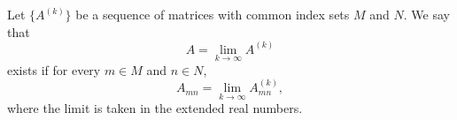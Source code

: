 Let $\{A^{(k)}\}$ be a sequence of matrices with common index sets $M$ and $N$. We say that
$$A = \lim_{k \to \infty} A^{(k)}$$
exists if for every $m \in M$ and $n \in N$,
$$A_{mn} = \lim_{k \to \infty} A^{(k)}_{mn},$$
where the limit is taken in the extended real numbers.
